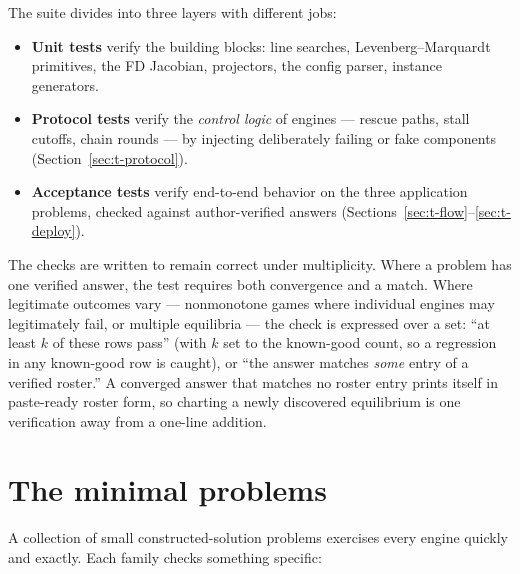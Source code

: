 The suite divides into three layers with different jobs:

\begin{itemize}
\item \textbf{Unit tests} verify the building blocks: line searches,
  Levenberg--Marquardt primitives, the FD Jacobian, projectors, the config
  parser, instance generators.
\item \textbf{Protocol tests} verify the \emph{control logic} of engines
  --- rescue paths, stall cutoffs, chain rounds --- by injecting
  deliberately failing or fake components (Section~\ref{sec:t-protocol}).
\item \textbf{Acceptance tests} verify end-to-end behavior on the three
  application problems, checked against author-verified answers
  (Sections~\ref{sec:t-flow}--\ref{sec:t-deploy}).
\end{itemize}

The checks are written to remain correct under multiplicity. Where a
problem has one verified answer, the test requires both convergence and a
match. Where legitimate outcomes vary --- nonmonotone games where
individual engines may legitimately fail, or multiple equilibria --- the
check is expressed over a set: ``at least $k$ of these rows pass'' (with
$k$ set to the known-good count, so a regression in any known-good row is
caught), or ``the answer matches \emph{some} entry of a verified roster.''
A converged answer that matches no roster entry prints itself in
paste-ready roster form, so charting a newly discovered equilibrium is one
verification away from a one-line addition.

\section{The minimal problems}
\label{sec:t-minimal}

A collection of small constructed-solution problems exercises every engine
quickly and exactly. Each family checks something specific:

